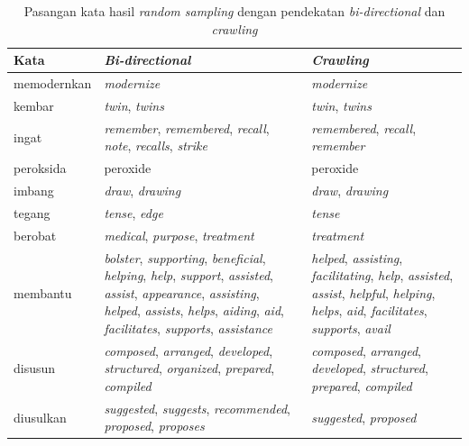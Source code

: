 \begin{table}
	\centering
	\caption{Pasangan kata hasil \textit{random sampling} dengan pendekatan \textit{bi-directional} dan \textit{crawling}}
	\label{table:random-sampling-enhancement}
	\begin{tabular}{|p{4cm}|p{4cm}|p{4cm}|}
		\hline
		\textbf{Kata} & \textbf{\textit{Bi-directional}} & \textbf{\textit{Crawling}}
		\\ \hline
		memodernkan & \textit{modernize} & \textit{modernize} \\ \hline
		kembar & \textit{twin}, \textit{twins} & \textit{twin}, \textit{twins} \\ \hline
		ingat & \textit{remember}, \textit{remembered}, \textit{recall}, \textit{note}, \textit{recalls}, \textit{strike} & \textit{remembered}, \textit{recall}, \textit{remember} \\ \hline
		peroksida & peroxide & peroxide \\ \hline
		imbang & \textit{draw}, \textit{drawing} & \textit{draw}, \textit{drawing} \\ \hline
		tegang & \textit{tense}, \textit{edge} & \textit{tense} \\ \hline
		berobat & \textit{medical}, \textit{purpose}, \textit{treatment} & \textit{treatment} \\ \hline
		membantu & \textit{bolster}, \textit{supporting}, \textit{beneficial}, \textit{helping}, \textit{help}, \textit{support}, \textit{assisted}, \textit{assist}, \textit{appearance}, \textit{assisting}, \textit{helped}, \textit{assists}, \textit{helps}, \textit{aiding}, \textit{aid}, \textit{facilitates}, \textit{supports}, \textit{assistance} & \textit{helped}, \textit{assisting}, \textit{facilitating}, \textit{help}, \textit{assisted}, \textit{assist}, \textit{helpful}, \textit{helping}, \textit{helps}, \textit{aid}, \textit{facilitates}, \textit{supports}, \textit{avail} \\ \hline
		disusun & \textit{composed}, \textit{arranged}, \textit{developed}, \textit{structured}, \textit{organized}, \textit{prepared}, \textit{compiled} & \textit{composed}, \textit{arranged}, \textit{developed}, \textit{structured}, \textit{prepared}, \textit{compiled} \\ \hline
		diusulkan & \textit{suggested}, \textit{suggests}, \textit{recommended}, \textit{proposed}, \textit{proposes} & \textit{suggested}, \textit{proposed} \\ \hline
	\end{tabular}
\end{table}

